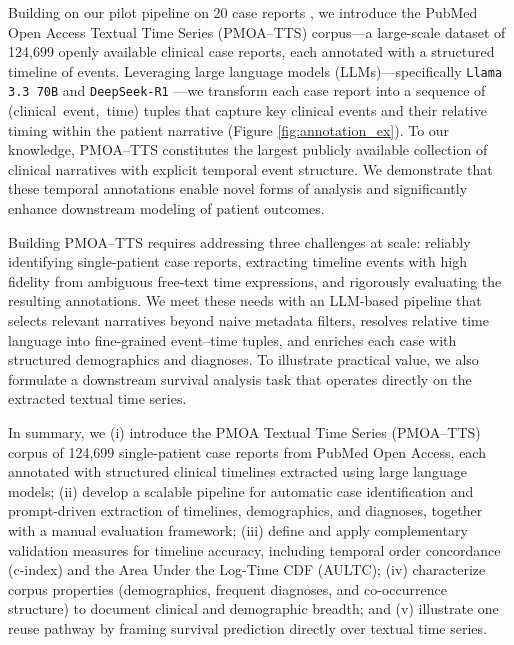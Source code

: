 \documentclass[pdflatex,sn-mathphys-num]{sn-jnl}%
\theoremstyle{thmstyleone}%
\theoremstyle{thmstyletwo}%
\theoremstyle{thmstylethree}%
\begin{document}
Building on our pilot pipeline on 20 case reports \citep{wang2025large}, we introduce the PubMed Open Access Textual Time Series (PMOA–TTS) corpus—a large-scale dataset of 124,699 openly available clinical case reports, each annotated with a structured timeline of events.
Leveraging large language models (LLMs)—specifically \texttt{Llama 3.3 70B} \citep{grattafiori2024llama} and \texttt{DeepSeek-R1} \citep{guo2025deepseek}—we transform each case report into a sequence of \mbox{(clinical event, time)} tuples that capture key clinical events and their relative timing within the patient narrative (Figure \ref{fig:annotation_ex}).
To our knowledge, PMOA–TTS constitutes the largest publicly available collection of clinical narratives with explicit temporal event structure.
We demonstrate that these temporal annotations enable novel forms of analysis and significantly enhance downstream modeling of patient outcomes.

Building PMOA--TTS requires addressing three challenges at scale: reliably identifying single-patient case reports, extracting timeline events with high fidelity from ambiguous free-text time expressions, and rigorously evaluating the resulting annotations. We meet these needs with an LLM-based pipeline that selects relevant narratives beyond naive metadata filters, resolves relative time language into fine-grained event--time tuples, and enriches each case with structured demographics and diagnoses. To illustrate practical value, we also formulate a downstream survival analysis task that operates directly on the extracted textual time series.



In summary, we (i) introduce the PMOA Textual Time Series (PMOA--TTS) corpus of 124{,}699 single-patient case reports from PubMed Open Access, each annotated with structured clinical timelines extracted using large language models; (ii) develop a scalable pipeline for automatic case identification and prompt-driven extraction of timelines, demographics, and diagnoses, together with a manual evaluation framework; (iii) define and apply complementary validation measures for timeline accuracy, including temporal order concordance (c-index) and the Area Under the Log-Time CDF (AULTC); (iv) characterize corpus properties (demographics, frequent diagnoses, and co-occurrence structure) to document clinical and demographic breadth; and (v) illustrate one reuse pathway by framing survival prediction directly over textual time series.
\end{document}
